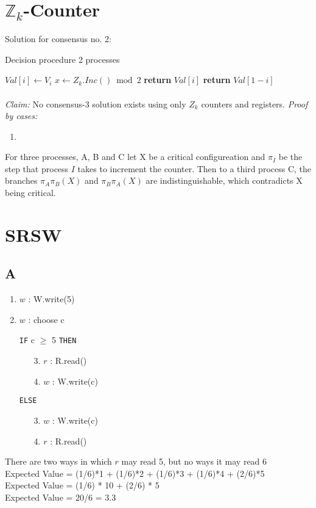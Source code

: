 \documentclass[10pt, letterpaper]{article}
\begin{document}
\section{$\mathbb{Z}_k$-Counter}
Solution for consensus no. 2:
\begin{algorithm}
\caption{Decision procedure 2 processes}\label{euclid}
\begin{algorithmic}[1]
    \State $Val[i] \gets V_i$
    \State $x\gets Z_k.Inc() \bmod 2$
        \State \textbf{return} $Val[i]$
    \Else
        \State \textbf{return} $Val[1 - i]$
    \EndIf
\EndProcedure
\end{algorithmic}
\end{algorithm}

\paragraph{} \textit{Claim:} No consensus-3 solution exists using only $Z_k$ counters and registers. \textit{Proof by cases:} 
\begin{enumerate}
    \item 
\end{enumerate}
For three processes, A, B and C let X be a critical configureation and $\pi_I$ be the step that process $I$ takes to increment the counter. Then to a third process C, the branches $\pi_A\pi_B(X)$ and $\pi_B\pi_A(X)$ are indistinguishable, which contradicts X being critical.

\section{SRSW}
\subsection{A} 
\begin{enumerate}[topsep=0pt,itemsep=-1ex,partopsep=1ex,parsep=1ex]
    \item $w$ : W.write(5)
    \item $w$ : choose c
    \item[\texttt{IF}] c $\geq$ 5 \texttt{THEN}
    \begin{enumerate}[topsep=0pt,itemsep=-1ex,partopsep=1ex,parsep=1ex]
        \item[3.] $r$ : R.read()
        \item[4.] $w$ : W.write(c)
    \end{enumerate}
    \item[\texttt{ELSE}]
    \begin{enumerate}[topsep=0pt,itemsep=-1ex,partopsep=1ex,parsep=1ex]
        \item[3.] $w$ : W.write(c)
        \item[4.] $r$ : R.read()
    \end{enumerate}
\end{enumerate}
There are two ways in which $r$ may read 5, but no ways it may read 6 \\
Expected Value = (1/6)*1 + (1/6)*2 + (1/6)*3 + (1/6)*4 + (2/6)*5 \\
Expected Value = (1/6) * 10 + (2/6) * 5 \\
Expected Value = 20/6 = 3.3 \\
\end{document}
